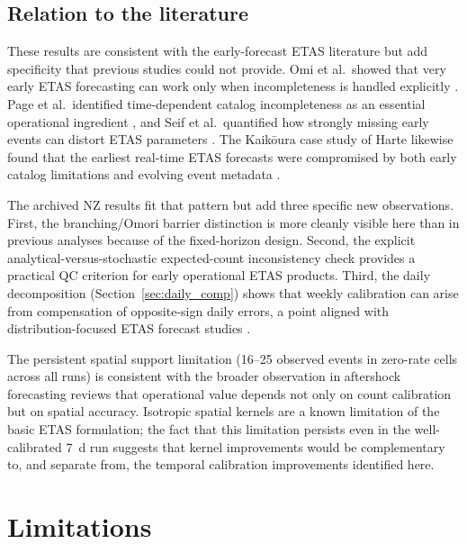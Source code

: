 \documentclass[12pt,letterpaper]{article}
\begin{document}
\subsection{Relation to the literature}

These results are consistent with the early-forecast ETAS literature but add
specificity that previous studies could not provide. Omi et al.\ showed that
very early ETAS forecasting can work only when incompleteness is handled
explicitly \cite{omi2013,omi2014,omi2015}. Page et al.\ identified
time-dependent catalog incompleteness as an essential operational ingredient
\cite{page2016}, and Seif et al.\ quantified how strongly missing early events
can distort ETAS parameters \cite{seif2017}. The Kaik\={o}ura case study of
Harte likewise found that the earliest real-time ETAS forecasts were compromised
by both early catalog limitations and evolving event metadata \cite{harte2019}.

The archived NZ results fit that pattern but add three specific new observations.
First, the branching/Omori barrier distinction is more cleanly visible here than
in previous analyses because of the fixed-horizon design. Second, the explicit
analytical-versus-stochastic expected-count inconsistency check provides a
practical QC criterion for early operational ETAS products. Third, the daily
decomposition (Section~\ref{sec:daily_comp}) shows that weekly calibration can
arise from compensation of opposite-sign daily errors, a point aligned with
distribution-focused ETAS forecast studies \cite{harte2017dist,savran2020}.

The persistent spatial support limitation (16--25 observed events in zero-rate
cells across all runs) is consistent with the broader observation in aftershock
forecasting reviews \cite{hardebeck2024} that operational value depends not only
on count calibration but on spatial accuracy. Isotropic spatial kernels are a
known limitation of the basic ETAS formulation; the fact that this limitation
persists even in the well-calibrated 7~d run suggests that kernel improvements
would be complementary to, and separate from, the temporal calibration
improvements identified here.

\section{Limitations}
\end{document}
